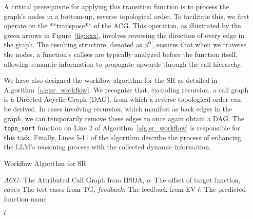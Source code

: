 \documentclass[acmsmall,screen,review,anonymous]{acmart} %
\begin{document}
A critical prerequisite for applying this transition function is to process the graph's nodes in a bottom-up, reverse topological order. To facilitate this, we first operate on the **transpose** of the ACG. This operation, as illustrated by the green arrows in Figure~\ref{fig:xxx}, involves reversing the direction of every edge in the graph. The resulting structure, denoted as \(\mathcal{G}^T\), ensures that when we traverse the nodes, a function's callees are typically analyzed before the function itself, allowing semantic information to propagate upwards through the call hierarchy.

We have also designed the workflow algorithm for the SR as detailed in Algorithm~\ref{alg:sr_workflow}. We recognize that, excluding recursion, a call graph is a Directed Acyclic Graph (DAG), from which a reverse topological order can be derived. In cases involving recursion, which manifest as back edges in the graph, we can temporarily remove these edges to once again obtain a DAG. The \texttt{topo\_sort} function on Line 2 of Algorithm~\ref{alg:sr_workflow} is responsible for this task. Finally, Lines 5-11 of the algorithm describe the process of enhancing the LLM's reasoning process with the collected dynamic information.

\begin{algorithm}
  \caption{Workflow Algorithm for SR}
  \label{alg:sr_workflow}
  \begin{algorithmic}[1]
    \REQUIRE $ACG$: The Attributed Call Graph from HSDA, $o$: The offset of target function, $cases$ The test cases from TG, $feedback$: The feedback from EV
    \ENSURE $l$: The predicted function name


        \ELSE
        \ENDIF
    \ENDWHILE

    \ENDIF

    \RETURN $l$
  \end{algorithmic}
\end{algorithm}

\end{document}
